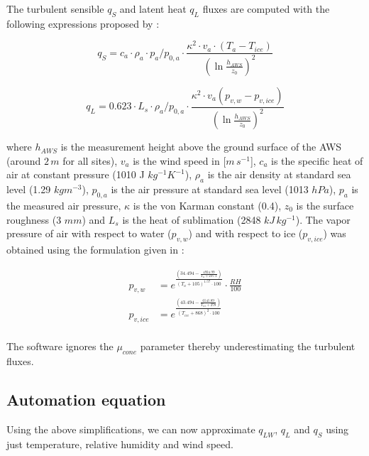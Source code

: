 \documentclass[utf8]{frontiersSCNS}
\begin{document}
The turbulent sensible $q_{S}$ and latent heat $q_{L}$ fluxes are computed with the following expressions
proposed by \cite{Garratt_1992}:

\begin{equation}
	q_{S}= c_{a} \cdot \rho_{a} \cdot p_{a}/p_{0,a} \cdot \frac{\kappa^2 \cdot v_a \cdot
		(T_a-T_{ice})}{{(\ln{\frac{h_{AWS}}{z_{0}}})}^2}
	\label{eqn:qs}
\end{equation}

\begin{equation}
	q_{L}= 0.623 \cdot L_s \cdot \rho_{a}/p_{0,a} \cdot \frac{\kappa^2 \cdot
	v_a(p_{v,w}-p_{v,ice})}{{(\ln{\frac{h_{AWS}}{z_{0}}})}^2}
\end{equation}

where $h_{AWS}$ is the measurement height above the ground surface of the AWS (around $2\,m$ for all sites),
$v_a$ is the wind speed in [$m\,s^{-1}$], $c_a$ is the specific heat of air at constant pressure (1010 J
$kg^{-1} K^{-1}$), $\rho_{a}$ is the air density at standard sea level (1.29 $kg m^{-3}$), $p_{0,a}$ is the air
pressure at standard sea level (1013 $hPa$), $p_{a}$ is the measured air pressure, $\kappa$ is the von Karman
constant (0.4), $z_{0}$ is the surface roughness (3 $mm$) and $L_s$ is the heat of sublimation (2848
$kJ\,kg^{-1}$).  The vapor pressure of air with respect to water ($p_{v,w}$) and with respect to ice
($p_{v,ice}$) was obtained using the formulation given in \cite{huang_2018} :

\begin{equation}
	\begin{split}
		p_{v,w}&=e^{\frac{(34.494 - \frac{4924.99}{T_{a} + 237.1})}{(T_a + 105)^{1.57} \cdot 100}} \cdot \frac{RH}{100} \\
		p_{v,ice}&=e^{\frac{(43.494 - \frac{6545.89}{T_{ice} + 278})}{(T_{ice} + 868)^{2} \cdot 100}} \\
	\end{split} \label{eqn:vp}
\end{equation}

The software ignores the $\mu_{cone}$ parameter thereby underestimating the turbulent fluxes.

\subsection{Automation equation}
Using the above simplifications, we can now approximate $q_{LW}$, $q_{L}$ and $q_{S}$ using just temperature,
relative humidity and wind speed. 
\end{document}
